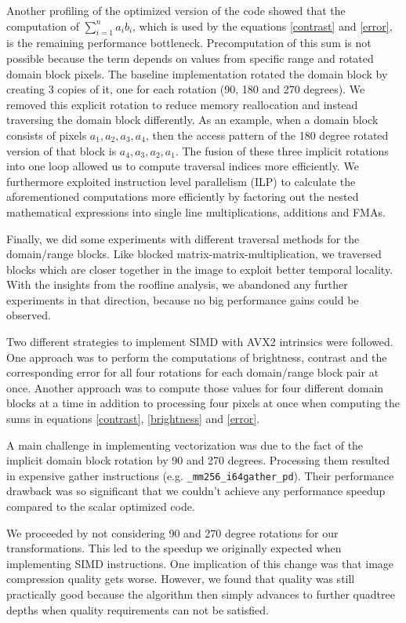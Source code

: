 Another profiling of the optimized version of the code showed that the
computation of $\sum_{i=1}^n a_i b_i$, which is used by the equations
\eqref{contrast} and \eqref{error}, is the remaining performance bottleneck.
Precomputation of this sum is not possible because the term depends on values
from specific range and rotated domain block pixels. The baseline implementation
rotated the domain block by creating 3 copies of it, one for each rotation (90,
180 and 270 degrees). We removed this explicit rotation to reduce memory
reallocation and instead traversing the domain block differently. As an example,
when a domain block consists of pixels $a_1, a_2, a_3, a_4$, then the access
pattern of the 180 degree rotated version of that block is $a_4, a_3, a_2, a_1$.
The fusion of these three implicit rotations into one loop allowed us to compute
traversal indices more efficiently. We furthermore exploited instruction level
parallelism (ILP) to calculate the aforementioned computations more efficiently
by factoring out the nested mathematical expressions into single line
multiplications, additions and FMAs.

Finally, we did some experiments with different traversal methods for the
domain/range blocks. Like blocked matrix-matrix-multiplication, we traversed
blocks which are closer together in the image to exploit better temporal
locality. With the insights from the roofline analysis, we abandoned any further
experiments in that direction, because no big performance gains could be
observed.

 Two different strategies to implement SIMD with AVX2 intrinsics
were followed. One approach was to perform the computations of brightness,
contrast and the corresponding error for all four rotations for each
domain/range block pair at once. Another approach was to compute
those values for four different domain blocks at a time in
addition to processing four pixels at once when computing the sums in equations
\eqref{contrast}, \eqref{brightness} and \eqref{error}.

A main challenge in implementing vectorization was due to the fact of the implicit
domain block rotation by 90 and 270 degrees. Processing them resulted in expensive
gather instructions (e.g. \verb|_mm256_i64gather_pd|). Their performance drawback was
so significant that we couldn't achieve any performance speedup compared to the scalar
optimized code.

We proceeded by not considering 90 and 270 degree rotations for our transformations.
This led to the speedup we originally expected when implementing SIMD instructions.
One implication of this change was that image compression quality gets worse. However, we found that quality
was still practically good because the algorithm then simply advances to further quadtree
depths when quality requirements can not be satisfied.

